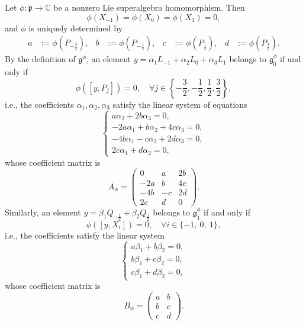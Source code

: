 \documentclass[12pt,reqno]{article}
\def\o{\overline}
\def\a{\alpha}
\def\F{\mathfrak}
\def\CC{\mathbb{C}}
\def\beqn{\begin{equation*}}
\def\eeqn{\end{equation*}}
\def\beq{\begin{equation}}
\def\eeq{\end{equation}}
\def\({\left(}
\def\){\right)}
\begin{document}
Let $\phi\colon\F{p}\rightarrow\CC$ be a nonzero Lie superalgebra homomorphism. Then
\beqn
\phi(X_{-1})=\phi(X_0)=\phi(X_1)=0,
\eeqn
and $\phi$ is uniquely determined by
\beqn
\begin{aligned}
a&:=\phi\left(P_{-\frac{3}{2}}\right), & b&:=\phi\left(P_{-\frac{1}{2}}\right),&
c&:=\phi\left(P_{\frac{1}{2}}\right), & d&:=\phi\left(P_{\frac{3}{2}}\right).
\end{aligned}
\eeqn
By the definition of $\F{g}^\phi$, an element $y=\a_1 L_{-1}+\a_2 L_0+\a_3 L_1$ belongs to $\F{g}_{\o{0}}^\phi$ if and only if
\beqn
\phi\([y,P_j]\)=0,\quad \forall j\in\left\{ -\dfrac{3}{2},-\dfrac{1}{2}, \dfrac{1}{2},\dfrac{3}{2}\right\},
\eeqn
i.e., the coefficients $\a_1,\a_2,\a_3$ satisfy the linear system of equations
\beq\label{F4.1}
\begin{cases}
a\alpha_2+2b\alpha_3=0,\\
-2a\alpha_1+b\alpha_2+4c\alpha_3=0,\\
-4b\alpha_1-c\alpha_2+2d\alpha_3=0,\\
2c\alpha_1+d\alpha_2=0,
\end{cases}
\eeq
whose coefficient matrix is
\beqn
A_\phi=
\begin{pmatrix}
0 & a & 2b\\
-2a & b & 4c\\
-4b & -c & 2d\\
2c & d & 0
\end{pmatrix}.
\eeqn
Similarly, an element $y=\beta_1 Q_{-\frac12}+\beta_2 Q_{\frac12}$ belongs to $\F{g}^\phi_{\o{1}}$ if and only if 
\beqn
\phi\([y,X_i]\)=0,\quad \forall i\in \{-1,~0,~1\},
\eeqn
i.e., the coefficients satisfy the linear system
\beq\label{F4.2}
\begin{cases}
a\beta_1+b\beta_2=0,\\
b\beta_1+c\beta_2=0,\\
c\beta_1+d\beta_2=0,
\end{cases}
\eeq
whose coefficient matrix is
\beqn
B_\phi=
\begin{pmatrix}
a & b\\
b & c\\
c & d
\end{pmatrix}.
\eeqn
\end{document}
